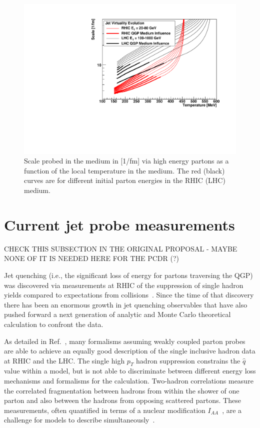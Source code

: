 \begin{figure}[!hbt]
 \begin{center}
   \includegraphics[width=0.95\linewidth]{figs/figure_nagle_jetvirtuality}
   \caption[Scale probed in the medium via high energy partons as a
   function of the local temperature in the medium]{Scale probed in
     the medium in [1/fm] via high energy partons as a function of the
     local temperature in the medium.  The red (black) curves are for
     different initial parton energies in the RHIC (LHC) medium.}
  \label{fig:magic2}
 \end{center}
\end{figure}


\section{Current jet probe measurements}
 \label{currentjetdata}

CHECK THIS SUBSECTION IN THE ORIGINAL PROPOSAL - MAYBE NONE OF IT IS NEEDED HERE FOR THE PCDR (?)

 Jet quenching (i.e., the significant loss of energy for partons
 traversing the QGP) was discovered via measurements at RHIC of the
 suppression of single hadron yields compared to expectations from \pp
 collisions~\cite{Adcox:2001jp,Adler:2002xw}.  Since the time of that
 discovery there has been an enormous growth in jet quenching
 observables that have also pushed forward a next generation of
 analytic and Monte Carlo theoretical calculation to confront the
 data.

As detailed in Ref.~\cite{Adare:2008cg,Bass:2008rv}, many
formalisms assuming weakly coupled parton probes are able to achieve an equally
good description of the single inclusive hadron data at RHIC and the LHC.
The single high $p_T$ hadron suppression constrains
the $\hat{q}$ value within a model, but is not able to discriminate
between different energy loss mechanisms and formalisms for the
calculation.  Two-hadron correlations measure the correlated
fragmentation between hadrons from within the shower of one parton and
also between the hadrons from opposing scattered partons.  These
measurements, often quantified in terms of a nuclear modification
$I_{AA}$~\cite{Adare:2010ry,Adare:2010mq,Adams:2005ph}, are a
challenge for models to describe simultaneously~\cite{Nagle:2009wr}.

